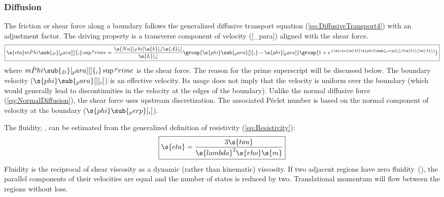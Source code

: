 \subsubsection{Diffusion}

The friction or shear force along a boundary follows the generalized diffusive transport equation (\ref{eq:DiffusiveTransport4}) with an adjustment factor.  The  driving property is a transverse component of velocity ([_para]) aligned with the shear force.
\begin{equation}
  \label{eq:ShearForce}
  \boxed{\s{eta}\dot{mPhi}\sub{_D}[_para][ ]{_i}\sup{^prime} = \frac{\s{Nu}[_Phi]\s{k}[_i]\s{A}[_i]}{\s{L}[_i]}\group{\s{phi}\sub{_para}[ ]{_i} - \s{phi}[_para]}\group{1 + e^{\mp\s{eta}\s{M}\s{phi}\sub{_perp}[_i]/2\s{k}[_i]\s{A}[_i]}}}
\end{equation}
where $\dot{mPhi}\sub{_D}[_para][ ]{_i}\sup{^prime}$ is the shear force.  The reason for the prime superscript will be discussed below.  The boundary velocity ($\s{phi}\sub{_para}[ ][_i]$) is an effective velocity.  Its usage does not imply that the velocity is uniform over the boundary (which would generally lead to discontinuities in the velocity at the edges of the boundary).  Unlike the normal diffusive force (\autoref{eq:NormalDiffusion}), the shear force uses upstream discretization.  The associated P\'eclet number is based on the normal component of velocity at the boundary ($\s{phi}\sub{_perp}[_i]$).

The fluidity, , can be estimated from the generalized definition of resistivity (\autoref{eq:Resistivity}):
\begin{equation}
  \label{eq:Fluidity}
  \boxed{\s{eta} = \frac{3\s{tau}}{\s{lambda}^2\s{rho}\s{m}}}
\end{equation}
Fluidity is the reciprocal of shear viscosity as a dynamic (rather than kinematic) viscosity.  If two adjacent regions have zero fluidity~(), the parallel components of their velocities are equal and the number of states is reduced by two.  Translational momentum will flow between the regions without loss.

